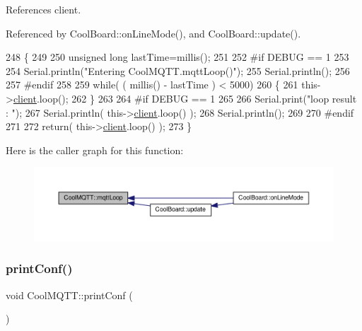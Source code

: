 References client.



Referenced by Cool\+Board\+::on\+Line\+Mode(), and Cool\+Board\+::update().


\begin{DoxyCode}
248 \{
249 
250     \textcolor{keywordtype}{unsigned} \textcolor{keywordtype}{long} lastTime=millis();
251 
252 \textcolor{preprocessor}{#if DEBUG == 1}
253 
254     Serial.println(\textcolor{stringliteral}{"Entering CoolMQTT.mqttLoop()"});
255     Serial.println();
256 
257 \textcolor{preprocessor}{#endif  }
258 
259     \textcolor{keywordflow}{while}( ( millis() - lastTime ) < 5000)
260     \{
261         this->\hyperlink{classCoolMQTT_a4ca71e4f76ef868692a297efd45b1415}{client}.loop();  
262     \}
263 
264 \textcolor{preprocessor}{#if DEBUG == 1 }
265     
266     Serial.print(\textcolor{stringliteral}{"loop result : "});
267     Serial.println( this->\hyperlink{classCoolMQTT_a4ca71e4f76ef868692a297efd45b1415}{client}.loop() );
268     Serial.println();
269 
270 \textcolor{preprocessor}{#endif}
271 
272     \textcolor{keywordflow}{return}( this->\hyperlink{classCoolMQTT_a4ca71e4f76ef868692a297efd45b1415}{client}.loop() );
273 \}
\end{DoxyCode}
Here is the caller graph for this function\+:
\nopagebreak
\begin{figure}[H]
\begin{center}
\leavevmode
\includegraphics[width=350pt]{classCoolMQTT_aa5eaae967b562b62cbcf2b8d81f6e5d5_icgraph}
\end{center}
\end{figure}
\mbox{\label{classCoolMQTT_a40553a0ad4b5ecf1cb4411ab54ca85fb}} 
\subsubsection{\texorpdfstring{print\+Conf()}{printConf()}}
{\footnotesize\ttfamily void Cool\+M\+Q\+T\+T\+::print\+Conf (\begin{DoxyParamCaption}{ }\end{DoxyParamCaption})}

